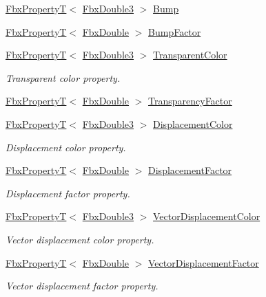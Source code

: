 \begin{DoxyCompactItemize}
\item 
\hyperlink{class_fbx_property_t}{Fbx\+PropertyT}$<$ \hyperlink{fbxtypes_8h_ae0a96f14cde566774c7553aa7523b7a7}{Fbx\+Double3} $>$ \hyperlink{class_fbx_surface_lambert_a1efc60f9887c83c861e4c428c4b6fb8d}{Bump}
\item 
\hyperlink{class_fbx_property_t}{Fbx\+PropertyT}$<$ \hyperlink{fbxtypes_8h_a171e72a1c46fc15c1a6c9c31948c1c5b}{Fbx\+Double} $>$ \hyperlink{class_fbx_surface_lambert_a23af5e6809344bdf94212955b1a3ed53}{Bump\+Factor}
\item 
\hyperlink{class_fbx_property_t}{Fbx\+PropertyT}$<$ \hyperlink{fbxtypes_8h_ae0a96f14cde566774c7553aa7523b7a7}{Fbx\+Double3} $>$ \hyperlink{class_fbx_surface_lambert_a29a56ddffd15311f51d0b2cbb09d4659}{Transparent\+Color}
\begin{DoxyCompactList}\small\item\em Transparent color property. \end{DoxyCompactList}\item 
\hyperlink{class_fbx_property_t}{Fbx\+PropertyT}$<$ \hyperlink{fbxtypes_8h_a171e72a1c46fc15c1a6c9c31948c1c5b}{Fbx\+Double} $>$ \hyperlink{class_fbx_surface_lambert_a9fbe9676ad1a4f56bcbde345113ccccd}{Transparency\+Factor}
\item 
\hyperlink{class_fbx_property_t}{Fbx\+PropertyT}$<$ \hyperlink{fbxtypes_8h_ae0a96f14cde566774c7553aa7523b7a7}{Fbx\+Double3} $>$ \hyperlink{class_fbx_surface_lambert_a8a3ed77989cf29c09cc0f2ba984f908b}{Displacement\+Color}
\begin{DoxyCompactList}\small\item\em Displacement color property. \end{DoxyCompactList}\item 
\hyperlink{class_fbx_property_t}{Fbx\+PropertyT}$<$ \hyperlink{fbxtypes_8h_a171e72a1c46fc15c1a6c9c31948c1c5b}{Fbx\+Double} $>$ \hyperlink{class_fbx_surface_lambert_a13018502111bc9498c11a9538f90e9d2}{Displacement\+Factor}
\begin{DoxyCompactList}\small\item\em Displacement factor property. \end{DoxyCompactList}\item 
\hyperlink{class_fbx_property_t}{Fbx\+PropertyT}$<$ \hyperlink{fbxtypes_8h_ae0a96f14cde566774c7553aa7523b7a7}{Fbx\+Double3} $>$ \hyperlink{class_fbx_surface_lambert_a917ecf0cc6bbaa04b1378f8951c97ed6}{Vector\+Displacement\+Color}
\begin{DoxyCompactList}\small\item\em Vector displacement color property. \end{DoxyCompactList}\item 
\hyperlink{class_fbx_property_t}{Fbx\+PropertyT}$<$ \hyperlink{fbxtypes_8h_a171e72a1c46fc15c1a6c9c31948c1c5b}{Fbx\+Double} $>$ \hyperlink{class_fbx_surface_lambert_aaf322b932e6f2213e13b5b88ba5a0ff9}{Vector\+Displacement\+Factor}
\begin{DoxyCompactList}\small\item\em Vector displacement factor property. \end{DoxyCompactList}\end{DoxyCompactItemize}
